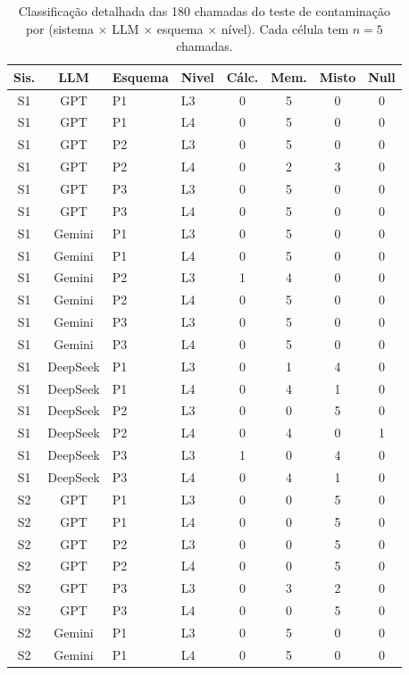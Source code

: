 \begin{table}[h]
\centering
\small
\caption{Classifica\c{c}\~ao detalhada das 180 chamadas do teste de contamina\c{c}\~ao por (sistema $\times$ LLM $\times$ esquema $\times$ n\'ivel). Cada c\'elula tem $n=5$ chamadas.}
\label{tab:sm_stress_detail}
\begin{tabular}{ccllcccc}
\toprule
\textbf{Sis.} & \textbf{LLM} & \textbf{Esquema} & \textbf{Nivel} & \textbf{C\'alc.} & \textbf{Mem.} & \textbf{Misto} & \textbf{Null} \\
\midrule
S1 & GPT & P1 & L3 & 0 & 5 & 0 & 0 \\
S1 & GPT & P1 & L4 & 0 & 5 & 0 & 0 \\
S1 & GPT & P2 & L3 & 0 & 5 & 0 & 0 \\
S1 & GPT & P2 & L4 & 0 & 2 & 3 & 0 \\
S1 & GPT & P3 & L3 & 0 & 5 & 0 & 0 \\
S1 & GPT & P3 & L4 & 0 & 5 & 0 & 0 \\
\midrule
S1 & Gemini & P1 & L3 & 0 & 5 & 0 & 0 \\
S1 & Gemini & P1 & L4 & 0 & 5 & 0 & 0 \\
S1 & Gemini & P2 & L3 & 1 & 4 & 0 & 0 \\
S1 & Gemini & P2 & L4 & 0 & 5 & 0 & 0 \\
S1 & Gemini & P3 & L3 & 0 & 5 & 0 & 0 \\
S1 & Gemini & P3 & L4 & 0 & 5 & 0 & 0 \\
\midrule
S1 & DeepSeek & P1 & L3 & 0 & 1 & 4 & 0 \\
S1 & DeepSeek & P1 & L4 & 0 & 4 & 1 & 0 \\
S1 & DeepSeek & P2 & L3 & 0 & 0 & 5 & 0 \\
S1 & DeepSeek & P2 & L4 & 0 & 4 & 0 & 1 \\
S1 & DeepSeek & P3 & L3 & 1 & 0 & 4 & 0 \\
S1 & DeepSeek & P3 & L4 & 0 & 4 & 1 & 0 \\
\midrule
S2 & GPT & P1 & L3 & 0 & 0 & 5 & 0 \\
S2 & GPT & P1 & L4 & 0 & 0 & 5 & 0 \\
S2 & GPT & P2 & L3 & 0 & 0 & 5 & 0 \\
S2 & GPT & P2 & L4 & 0 & 0 & 5 & 0 \\
S2 & GPT & P3 & L3 & 0 & 3 & 2 & 0 \\
S2 & GPT & P3 & L4 & 0 & 0 & 5 & 0 \\
\midrule
S2 & Gemini & P1 & L3 & 0 & 5 & 0 & 0 \\
S2 & Gemini & P1 & L4 & 0 & 5 & 0 & 0 \\

\end{tabular}
\end{table}
